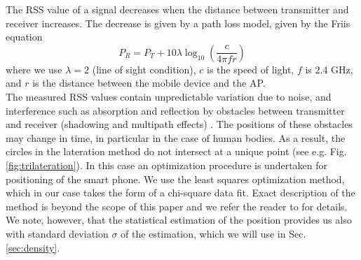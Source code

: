 \documentclass[10pt,a4paper]{article}
\begin{document}
The RSS value of a signal decreases when the distance between transmitter and receiver increases.
The decrease is given by a path loss model, given by the Friis equation
\begin{equation}
P_{R}=P_{T}+10\lambda\log_{10}(\frac{c}{4\pi fr})
\label{friis}
\end{equation}
where we use $\lambda=2$ (line of sight condition), $c$ is the speed of light, $f$ is 2.4 GHz, and $r$ is the distance between the mobile device and the AP.\\
The measured RSS values contain unpredictable variation due to noise, and interference such as absorption and reflection by obstacles between transmitter and receiver (shadowing and multipath effects) \cite{goldsmith}. The positions of these obstacles may change in time, in particular in the case of human bodies.
As a result, the circles in the lateration method do not intersect at a unique point (see e.g. Fig.\ref{fig:trilateration}). 
In this case an optimization procedure is undertaken for positioning of the smart phone.
We use the least squares optimization method, which in our case takes the form of a chi-square data fit. Exact description of the method is beyond the scope of this paper and we refer the reader to \cite{bevington} for details. We note, however, that the statistical estimation of the position provides us also with standard deviation $\sigma$ of the estimation, which we will use in Sec. \ref{sec:density}.

\end{document}
